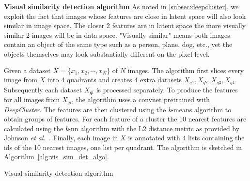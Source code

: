 \documentclass[12pt,a4paper]{article}
\begin{document}
\textbf{Visual similarity detection algorithm} As noted in \ref{subsec:deepcluster}, we exploit the fact that images whose features are close in latent space will also look similar in image space. The closer 2 features are in latent space the more visually similar 2 images will be in data space. "Visually similar" means both images contain an object of the same type such as a person, plane, dog, etc., yet the objects themselves may look substantially different on the pixel level.

Given a dataset $X = \{x_1,x_2,\cdots,x_N\}$ of $N$ images. The algorithm first slices every image from $X$ into 4 quadrants and creates 4 extra datasets $X_{q1}, X_{q2}, X_{q3}, X_{q4}$. Subsequently each dataset $X_{qi}$ is processed separately. To produce the features for all images from $X_{qi}$, the algorithm uses a convnet pretrained with \textit{DeepCluster}. The features are then clustered using the \textit{k}-means algorithm to obtain groups of features. For each feature of a cluster the 10 nearest features are calculated using the \textit{k}-nn algorithm with the L2 distance metric as provided by Johnson \textit{et al.}~\cite{FaissKnn}. Finally, each image in $X$ is annotated with 4 lists containing the ids of the 10 nearest images, one list per quadrant. The algorithm is sketched in Algorithm~\ref{alg:vis_sim_det_algo}.


\begin{algorithm}[H]
\DontPrintSemicolon
\LinesNumbered
{}
\caption{Visual similarity detection algorithm}\label{alg:vis_sim_det_algo}
\end{algorithm}
\end{document}

